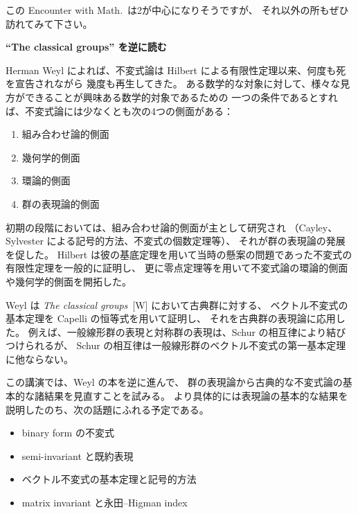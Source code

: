 \documentclass[uplatex,dvipdfmx]{jlreq}
\begin{document}
この Encounter with Math.~は2が中心になりそうですが、
それ以外の所もぜひ訪れてみて下さい。

\newpage

\begin{center}
  {\Large\bfseries ``The classical groups'' を逆に読む}
\end{center}

\bigskip
\hspace*{\fill}{\large\bfseries 寺西　鎮男（名古屋大・多元数理）}

\bigskip

Herman Weyl によれば、不変式論は Hilbert による有限性定理以来、何度も死を宣告されながら
幾度も再生してきた。
ある数学的な対象に対して、様々な見方ができることが興味ある数学的対象であるための
一つの条件であるとすれば、不変式論には少なくとも次の4つの側面がある：
\begin{enumerate}
  \item 組み合わせ論的側面
  \item 幾何学的側面
  \item 環論的側面
  \item 群の表現論的側面
\end{enumerate}

初期の段階においては、組み合わせ論的側面が主として研究され
（Cayley、Sylvester による記号的方法、不変式の個数定理等）、
それが群の表現論の発展を促した。
Hilbert は彼の基底定理を用いて当時の懸案の問題であった不変式の有限性定理を一般的に証明し、
更に零点定理等を用いて不変式論の環論的側面や幾何学的側面を開拓した。

Weyl は \textit{The classical groups}~[W] において古典群に対する、
ベクトル不変式の基本定理を Capelli の恒等式を用いて証明し、
それを古典群の表現論に応用した。
例えば、一般線形群の表現と対称群の表現は、Schur の相互律により結びつけられるが、
Schur の相互律は一般線形群のベクトル不変式の第一基本定理に他ならない。

この講演では、Weyl の本を逆に進んで、
群の表現論から古典的な不変式論の基本的な諸結果を見直すことを試みる。
より具体的には表現論の基本的な結果を説明したのち、次の話題にふれる予定である。
\begin{itemize}
  \item binary form の不変式
  \item semi-invariant と既約表現
  \item ベクトル不変式の基本定理と記号的方法
  \item matrix invariant と永田--Higman index
\end{itemize}
\end{document}

